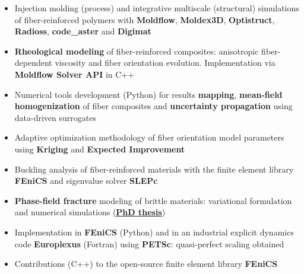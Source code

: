\documentclass[10pt,a4paper,ragged2e,withhyper]{altacv}
\begin{document}
\begin{paracol}{2}
  \begin{itemize}
    \item Injection molding (process) and integrative multiscale (structural) simulations of fiber-reinforced polymers with \textbf{Moldflow}, \textbf{Moldex3D}, \textbf{Optistruct}, \textbf{Radioss}, \textbf{code\_aster} and \textbf{Digimat}
    \item \textbf{Rheological modeling} of fiber-reinforced composites: anisotropic fiber-dependent viscosity and fiber orientation evolution. Implementation via \textbf{Moldflow Solver API} in C++
    \item Numerical tools development (Python) for results \textbf{mapping}, \textbf{mean-field homogenization} of fiber composites and \textbf{uncertainty propagation} using data-driven surrogates
    \item Adaptive optimization methodology of fiber orientation model parameters using \textbf{Kriging} and \textbf{Expected Improvement}
    \item Buckling analysis of fiber-reinforced materials with the finite element library \textbf{FEniCS} and eigenvalue solver \textbf{SLEPc}
  \end{itemize}

  \divider

  \begin{itemize}
    \item \textbf{Phase-field fracture} modeling of brittle materials: variational formulation and numerical simulations (\href{https://pastel.archives-ouvertes.fr/tel-01487449}{\faLink\textbf{PhD thesis}})
    \item Implementation in \textbf{FEniCS} (Python) and in an industrial explicit dynamics code \textbf{Europlexus} (Fortran) using \textbf{PETSc}: quasi-perfect scaling obtained
    \item Contributions (C++) to the open-source finite element library \textbf{FEniCS}
  \end{itemize}


\end{paracol}
\end{document}
